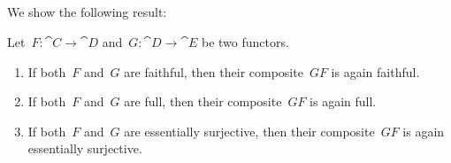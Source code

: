 \subsection{}



\subsubsection{}

We show the following result:

\begin{proposition}
	\label{composite of faithful full essentially surjective}
	Let~$F \colon \cat{C} \to \cat{D}$ and~$G \colon \cat{D} \to \cat{E}$ be two functors.
	\begin{enumerate}

		\item
			If both~$F$ and~$G$ are faithful, then their composite~$G F$ is again faithful.

		\item
			If both~$F$ and~$G$ are full, then their composite~$G F$ is again full.

		\item
			If both~$F$ and~$G$ are essentially surjective, then their composite~$G F$ is again essentially surjective.

	\end{enumerate}
\end{proposition}


